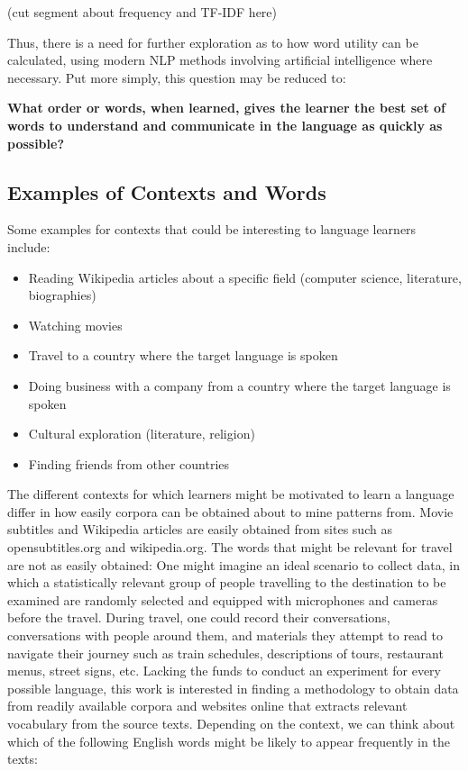 (cut segment about frequency and TF-IDF here)

Thus, there is a need for further exploration as to how word utility can be calculated, using modern NLP methods involving artificial intelligence where necessary.
Put more simply, this question may be reduced to:

\textbf{What order or words, when learned, gives the learner the best set of words to understand and communicate in the language as quickly as possible?}

\subsection{Examples of Contexts and Words}
Some examples for contexts that could be interesting to language learners include:

\begin{itemize}
	\item Reading Wikipedia articles about a specific field (computer science, literature, biographies)
	\item Watching movies
	\item Travel to a country where the target language is spoken
	\item Doing business with a company from a country where the target language is spoken
	\item Cultural exploration (literature, religion)
	\item Finding friends from other countries
\end{itemize}

The different contexts for which learners might be motivated to learn a language differ in how easily corpora can be obtained about to mine patterns from. Movie subtitles and Wikipedia articles are easily obtained from sites such as opensubtitles.org and wikipedia.org. The words that might be relevant for travel are not as easily obtained: One might imagine an ideal scenario to collect data, in which a statistically relevant group of people travelling to the destination to be examined are randomly selected and equipped with microphones and cameras before the travel. During travel, one could record their conversations, conversations with people around them, and materials they attempt to read to navigate their journey such as train schedules, descriptions of tours, restaurant menus, street signs, etc. Lacking the funds to conduct an experiment for every possible language, this work is interested in finding a methodology to obtain data from readily available corpora and websites online that extracts relevant vocabulary from the source texts.
Depending on the context, we can think about which of the following English words might be likely to appear frequently in the texts:

